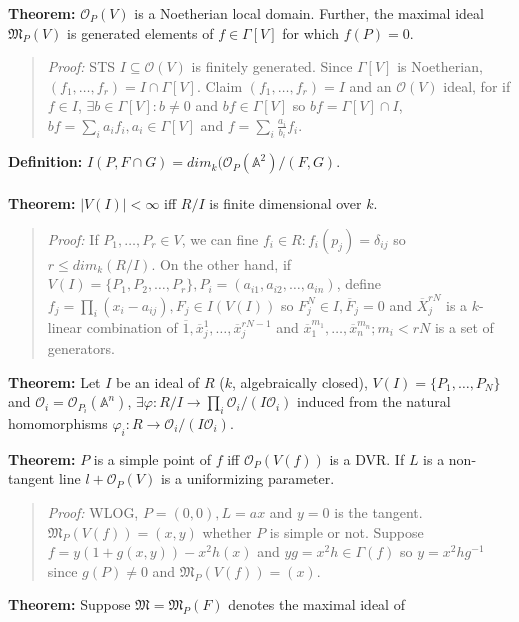 {\bf Theorem:}
${\mathcal O}_P(V)$ is a Noetherian local domain.  Further, the maximal ideal
${\mathfrak M}_P(V)$ is generated elements of $f \in \Gamma[V]$ for which $f(P)= 0$.
\begin{quote}
\emph{Proof:}
STS $I \subseteq
{\mathcal O}(V)$ is finitely generated.
Since $\Gamma[V]$ is Noetherian, $(f_1, \ldots, f_r)= I \cap \Gamma[V]$.  Claim
$(f_1, \ldots, f_r)= I$ and an
${\mathcal O}(V)$ ideal, for if $f \in I$, $\exists b \in \Gamma[V]: b \ne 0$ and
$bf \in \Gamma[V]$ so $bf= \Gamma[V] \cap I$, $bf= \sum_i a_i f_i, a_i \in \Gamma[V]$ and
$f= \sum_i {\frac {a_i} {b_i}} f_i$.
\end{quote}
{\bf Definition:}
$I(P, F \cap G)= dim_k({\mathcal O}_P({\mathbb A}^2)/(F, G)$.
\\
\\
{\bf Theorem:}
$|V(I)| < \infty$ iff $R/I$ is finite dimensional over $k$.
\begin{quote}
\emph{Proof:}
If $P_1, \ldots, P_r \in V$, we can fine $f_i \in R: f_i(p_j)= \delta_{ij}$ so
$r \le dim_k(R/I)$.
On the other hand,
if $V(I)= \{ P_1 , P_2 , \ldots , P_r \}, P_i= (a_{i1}, a_{i2}, \ldots, a_{in})$,
define $f_j= \prod_i (x_i - a_{ij}), F_j \in I(V(I))$ so $F_j^N \in I, {\overline F}_j= 0$
and ${\overline X}_j^{rN}$ is a $k$-linear combination of
$ {\overline 1}, {\overline x}_j^{1}, \ldots, {\overline x}_j^{rN-1} $ and
$ {\overline x}_1^{m_1}, \ldots, {\overline x}_n^{m_n}; m_i < rN $ is a set of generators.
\end{quote}
{\bf Theorem:}
Let $I$ be an ideal of $R$ ($k$, algebraically closed), $V(I)= \{P_1 , \ldots , P_N
\}$ and $
{\mathcal O}_i= {\mathcal O}_{P_i}({\mathbb A}^n) $,
$\exists \varphi: R/I \rightarrow \prod_i 
{\mathcal O}_i/(I{\mathcal O}_i)$ induced
from the natural homomorphisms $\varphi_i: R \rightarrow {\mathcal O}_i/(I{\mathcal O}_i)$.
\begin{quote}
\end{quote}
{\bf Theorem:} $P$ is a simple point of $f$ iff ${\mathcal O}_P(V(f))$ is a DVR.
If $L$ is a non-tangent line $l + {\mathcal O}_P(V)$ is a uniformizing parameter.
\begin{quote}
\emph{Proof:}
WLOG, $P=(0,0), L= ax$ and $y=0$ is the tangent.
${\mathfrak M}_P(V(f))= (x,y)$ whether $P$ is simple or not.
Suppose $f= y(1+g(x,y)) - x^2 h(x)$ and $yg= x^2h \in \Gamma(f)$ so
$y= x^2 h g^{-1}$ since $g(P) \ne 0$ and 
${\mathfrak M}_P(V(f))= (x)$.
\end{quote}
{\bf Theorem:}
Suppose ${\mathfrak M}= {\mathfrak M}_P(F)$ denotes the maximal ideal of 
